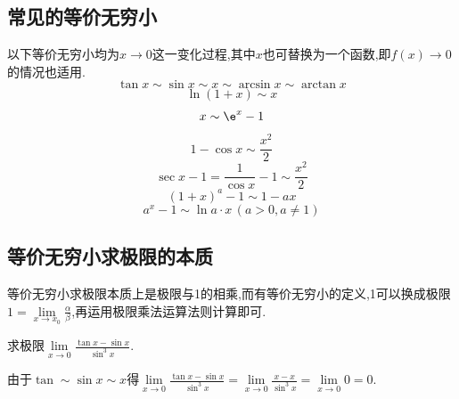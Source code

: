 \warn[
{\large \bf 0与``0"的区别}\vspace*{0.5em}\\
\hspace*{1em}(1)\quad ``0"指的是无穷小,设$\alpha$是某一变化过程中的无穷小,也就是说$x$趋于某一值时,极限为0.\vspace*{0.5em}\\
\hspace*{1em}(2)\quad 当0指的是实数0时,$\lim 0 \cdot f(x)=0$,这与$f(x)$无关,即使$\lim f(x)=\infty$,其结果仍然是0,因为0在这里是实数,而不是无穷小.
]


\subsection{常见的等价无穷小}
\ttheorem[常见的等价无穷小]
以下等价无穷小均为$x \to 0$这一变化过程,其中$x$也可替换为一个函数,即$f(x) \to 0$的情况也适用.
\begin{equation}
	\tan x \sim \sin x \sim x \sim \arcsin x \sim \arctan x
\end{equation}
\begin{equation}
	\ln (1+x) \sim x
\end{equation}
\begin{equation}
	x \sim \e^x -1
\end{equation}
\begin{equation}
	1-\cos x \sim \frac{x^2}{2}
\end{equation}
\begin{equation}
	\sec x -1 =\frac{1}{\cos x}-1 \sim \frac{x^2}{2}
\end{equation}
\begin{equation}
	(1+x)^a-1 \sim 1-ax
\end{equation}
\begin{equation}
	a^x-1 \sim \ln a \cdot x \,(a>0,a \ne 1)
\end{equation}
\subsection{等价无穷小求极限的本质}
等价无穷小求极限本质上是极限与1的相乘,而有等价无穷小的定义,1可以换成极限$\displaystyle 1=\lim\limits_{x \to x_0}\frac{\alpha }{\beta}$,再运用极限乘法运算法则计算即可.

\example[等价无穷小的误用]\sj
\examples \label{例 1.8}求极限$\displaystyle \lim\limits_{x \to 0}\frac{\tan x -\sin x}{\sin^3 x}$.

\errsolve  由于$\tan \sim \sin x \sim x$得$\displaystyle \lim\limits_{x \to 0}\frac{\tan x -\sin x}{\sin^3 x}=\lim\limits_{x \to 0}\frac{x-x}{\sin^3 x}=\lim\limits_{x \to 0}0=0.$

